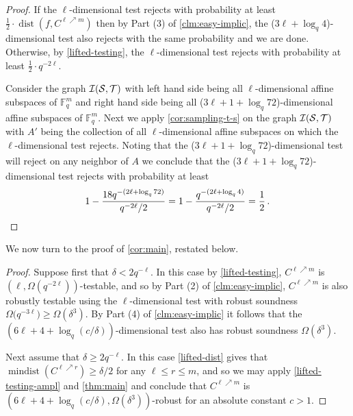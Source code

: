 \documentclass[11pt]{article}
\numberwithin{equation}{section}
\newtheorem{proposition}[theorem]{Proposition}
\theoremstyle{definition}
\theoremstyle{plain}
\theoremstyle{plain}
\DeclareMathOperator{\dist}{dist} %
\DeclareMathOperator{\mindist}{mindist}  %
\newcommand{\F}{{\mathbb{F}}}
\newcommand{\calI}{{\mathcal{I}}}
\begin{document}

\begin{proof}
If the $\ell$-dimensional test rejects with probability at least $\frac 1 2 \cdot \dist(f, C^{\ell \nearrow m})$ then by Part (3) of \cref{clm:easy-implic}, the ($3\ell+\log_q4$)-dimensional test also rejects with the same probability and we are done. Otherwise, by \cref{lifted-testing}, the $\ell$-dimensional test rejects with probability at least $\frac 1 2 \cdot q^{-2\ell}$.

%
Consider the  graph $\calI( \cal S, \cal T)$ with left hand side being all $\ell$-dimensional affine subspaces of $\F_q^m$ and right hand side being all ($3\ell+1+\log_q 72$)-dimensional affine subspaces of $\F_q^m$. Next we apply \cref{cor:sampling-t-s} on the graph $\calI (\cal S, \cal T)$ with
$A'$ being the collection of all $\ell$-dimensional affine subspaces on which the $\ell$-dimensional test rejects.
Noting that the ($3\ell+1+\log_q72$)-dimensional test will reject on any neighbor of $A$ we conclude that the ($3\ell+1+\log_q72$)-dimensional test rejects with probability at least
\[1 - \frac{18q^{-(2\ell+\log_q72)}} {q^{-2\ell} /2 }=1 -
\frac{q^{-(2\ell+\log_q4)}} {q^{-2\ell} /2 } = \frac{1} {2}\,. \qedhere\]
\end{proof}

We now turn to the proof of \cref{cor:main}, restated below.

\maincor*

%
%
%
%
%
%
%

\begin{proof}
Suppose first that $\delta < 2q^{-\ell}$.
In this case by \cref{lifted-testing}, $C^{\ell \nearrow m}$ is $(\ell,\Omega(q^{-2\ell}))$-testable, and so by Part (2) of
\cref{clm:easy-implic},
 $C^{\ell \nearrow m}$ is also robustly testable using the $\ell$-dimensional test with robust soundness $\Omega\big(q^{-3\ell}\big) \geq \Omega(\delta^3)$. By Part (4) of \cref{clm:easy-implic}
it follows that the $(6\ell +4+\log_q(c/\delta))$-dimensional test also has robust soundness $\Omega(\delta^3)$.

Next assume that $\delta \geq 2q^{-\ell}$. In this case \cref{lifted-dist} gives that $\mindist(C^{\ell \nearrow r})\geq \delta/2$ for any $\ell \leq r \leq m$, and so we may apply \cref{lifted-testing-ampl} and
 \cref{thm:main} and conclude that  $C^{\ell \nearrow m}$ is $(6\ell+4+\log_q(c/\delta),  \Omega( \delta^3))$-robust for an absolute constant $c >1$.
\end{proof}
\end{document}
